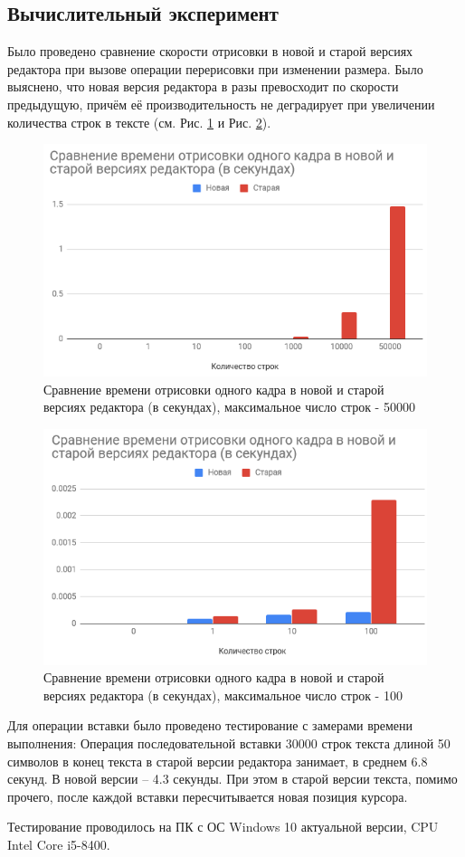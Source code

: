 \documentclass{fefu}
\begin{document}
		\subsection{Вычислительный эксперимент}
			\par Было проведено сравнение скорости отрисовки в новой и старой версиях 
			редактора при вызове операции перерисовки при изменении размера. Было выяснено, что 
			новая версия редактора в разы превосходит по скорости предыдущую, причём её 
			производительность не деградирует при увеличении количества строк в тексте (см. 
			Рис. \ref{img:RenderComparisonBig} и Рис. \ref{img:RenderComparisonSmall}).
			\begin{figure}[h]
				\centering
				\includegraphics[width=0.8\linewidth]{images/RenderComparisonBig.png}
				\caption{Сравнение времени отрисовки одного кадра в новой и старой версиях 
				редактора (в секундах), максимальное число строк - 50000}
				\label{img:RenderComparisonBig}
			\end{figure}
			\begin{figure}[H]
				\centering
				\includegraphics[width=0.8\linewidth]{images/RenderComparisonSmall.png}
				\caption{Сравнение времени отрисовки одного кадра в новой и старой версиях 
				редактора (в секундах), максимальное число строк - 100}
				\label{img:RenderComparisonSmall}
			\end{figure}
			\par Для операции вставки было проведено тестирование с замерами времени 
			выполнения:
			Операция последовательной вставки 30000 строк текста длиной 50 символов в конец
			текста в старой версии редактора занимает, в среднем 6.8 секунд. В новой 
			версии -- 4.3 секунды. При этом в старой версии текста, помимо прочего, после 
			каждой вставки пересчитывается новая позиция курсора.
			\par Тестирование проводилось на ПК с ОС Windows 10 актуальной версии, CPU Intel
			Core i5-8400.
\end{document}
